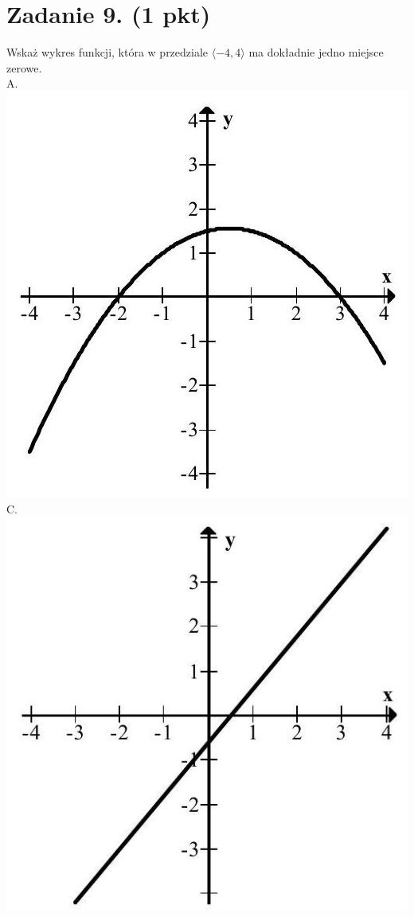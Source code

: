 \documentclass[10pt]{article}
\begin{document}
\section*{Zadanie 9. (1 pkt)}
Wskaż wykres funkcji, która w przedziale \(\langle-4,4\rangle\) ma dokładnie jedno miejsce zerowe.\\
A.\\
\includegraphics[max width=\textwidth, center]{2024_11_21_dcf819de2d2eef051a0dg-04}\\
C.\\
\includegraphics[max width=\textwidth, center]{2024_11_21_dcf819de2d2eef051a0dg-04(1)}\\
\end{document}
